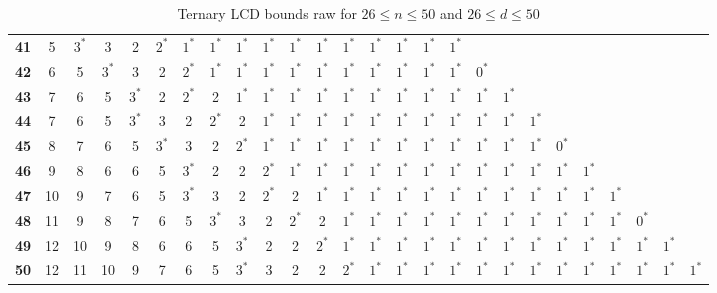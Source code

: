 \begin{table}
\begin{tabular}{|c| c c c c c c c c c c c c c c c c c c c c c c c c c |}
\textbf{41} & 5 & $3^*$ & 3 & 2 & $2^*$ & $1^*$ & $1^*$ & $1^*$ & $1^*$ & $1^*$ & $1^*$ & $1^*$ & $1^*$ & $1^*$ & $1^*$ & $1^*$ & & & & & & & & & \\
\textbf{42} & 6 & 5 & $3^*$ & 3 & 2 & $2^*$ & $1^*$ & $1^*$ & $1^*$ & $1^*$ & $1^*$ & $1^*$ & $1^*$ & $1^*$ & $1^*$ & $1^*$ & $0^*$ & & & & & & & & \\
\textbf{43} & 7 & 6 & 5 & $3^*$ & 2 & $2^*$ & 2 & $1^*$ & $1^*$ & $1^*$ & $1^*$ & $1^*$ & $1^*$ & $1^*$ & $1^*$ & $1^*$ & $1^*$ & $1^*$ & & & & & & & \\
\textbf{44} & 7 & 6 & 5 & $3^*$ & 3 & 2 & $2^*$ & 2 & $1^*$ & $1^*$ & $1^*$ & $1^*$ & $1^*$ & $1^*$ & $1^*$ & $1^*$ & $1^*$ & $1^*$ & $1^*$ & & & & & & \\
\textbf{45} & 8 & 7 & 6 & 5 & $3^*$ & 3 & 2 & $2^*$ & $1^*$ & $1^*$ & $1^*$ & $1^*$ & $1^*$ & $1^*$ & $1^*$ & $1^*$ & $1^*$ & $1^*$ & $1^*$ & $0^*$ & & & & & \\
\textbf{46} & 9 & 8 & 6 & 6 & 5 & $3^*$ & 2 & 2 & $2^*$ & $1^*$ & $1^*$ & $1^*$ & $1^*$ & $1^*$ & $1^*$ & $1^*$ & $1^*$ & $1^*$ & $1^*$ & $1^*$ & $1^*$ & & & & \\
\textbf{47} & 10 & 9 & 7 & 6 & 5 & $3^*$ & 3 & 2 & $2^*$ & 2 & $1^*$ & $1^*$ & $1^*$ & $1^*$ & $1^*$ & $1^*$ & $1^*$ & $1^*$ & $1^*$ & $1^*$ & $1^*$ & $1^*$ & & & \\
\textbf{48} & 11 & 9 & 8 & 7 & 6 & 5 & $3^*$ & 3 & 2 & $2^*$ & 2 & $1^*$ & $1^*$ & $1^*$ & $1^*$ & $1^*$ & $1^*$ & $1^*$ & $1^*$ & $1^*$ & $1^*$ & $1^*$ & $0^*$ & & \\
\textbf{49} & 12 & 10 & 9 & 8 & 6 & 6 & 5 & $3^*$ & 2 & 2 & $2^*$ & $1^*$ & $1^*$ & $1^*$ & $1^*$ & $1^*$ & $1^*$ & $1^*$ & $1^*$ & $1^*$ & $1^*$ & $1^*$ & $1^*$ & $1^*$ & \\
\textbf{50} & 12 & 11 & 10 & 9 & 7 & 6 & 5 & $3^*$ & 3 & 2 & 2 & $2^*$ & $1^*$ & $1^*$ & $1^*$ & $1^*$ & $1^*$ & $1^*$ & $1^*$ & $1^*$ & $1^*$ & $1^*$ & $1^*$ & $1^*$ & $1^*$ \\
\hline
\end{tabular}
\caption{Ternary LCD bounds raw for $26 \leq n \leq 50$ and $26 \leq d \leq 50$}
\label{tab:lp_tables_q3_26_50_26_50}
\end{table}